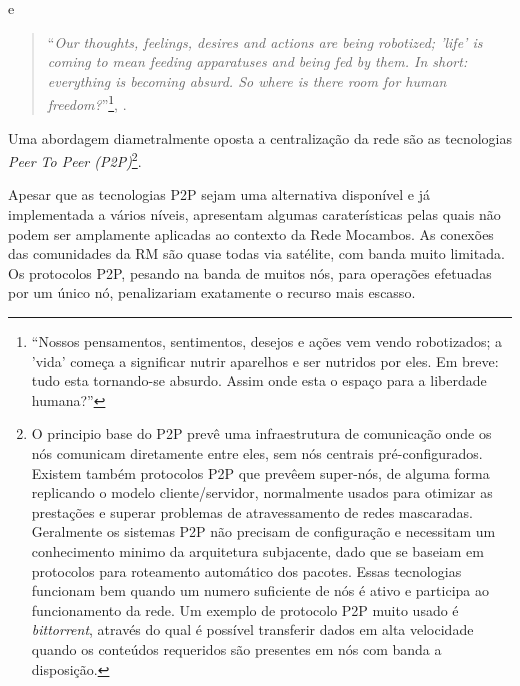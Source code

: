 e 

\begin{quote}
  ``\emph{Our thoughts, feelings, desires and actions are being
    robotized; 'life' is coming to mean feeding apparatuses and being
    fed by them. In short: everything is becoming absurd. So where is
    there room for human freedom?}''\footnote{``Nossos pensamentos,
    sentimentos, desejos e ações vem vendo robotizados; a 'vida'
    começa a significar nutrir aparelhos e ser nutridos por eles. Em
    breve: tudo esta tornando-se absurdo. Assim onde esta o espaço
    para a liberdade humana?''}, \citet{flusser1983philosophie}.
\end{quote}

Uma abordagem diametralmente oposta a centralização da rede são as
tecnologias \emph{Peer To Peer (P2P)}\footnote{O principio base do P2P
  prevê uma infraestrutura de comunicação onde os nós comunicam
  diretamente entre eles, sem nós centrais pré-configurados. Existem
  também protocolos P2P que prevêem super-nós, de alguma forma
  replicando o modelo cliente/servidor, normalmente usados para
  otimizar as prestações e superar problemas de atravessamento de
  redes mascaradas. Geralmente os sistemas P2P não precisam de
  configuração e necessitam um conhecimento minimo da arquitetura
  subjacente, dado que se baseiam em protocolos para roteamento
  automático dos pacotes. Essas tecnologias funcionam bem quando um
  numero suficiente de nós é ativo e participa ao funcionamento da
  rede. Um exemplo de protocolo P2P muito usado é \emph{bittorrent},
  através do qual é possível transferir dados em alta velocidade
  quando os conteúdos requeridos são presentes em nós com banda a
  disposição.}.

Apesar que as tecnologias P2P sejam uma alternativa disponível e já
implementada a vários níveis, apresentam algumas caraterísticas pelas
quais não podem ser amplamente aplicadas ao contexto da Rede
Mocambos. As conexões das comunidades da RM são quase todas via
satélite, com banda muito limitada. Os protocolos P2P, pesando na
banda de muitos nós, para operações efetuadas por um único nó,
penalizariam exatamente o recurso mais escasso.  


